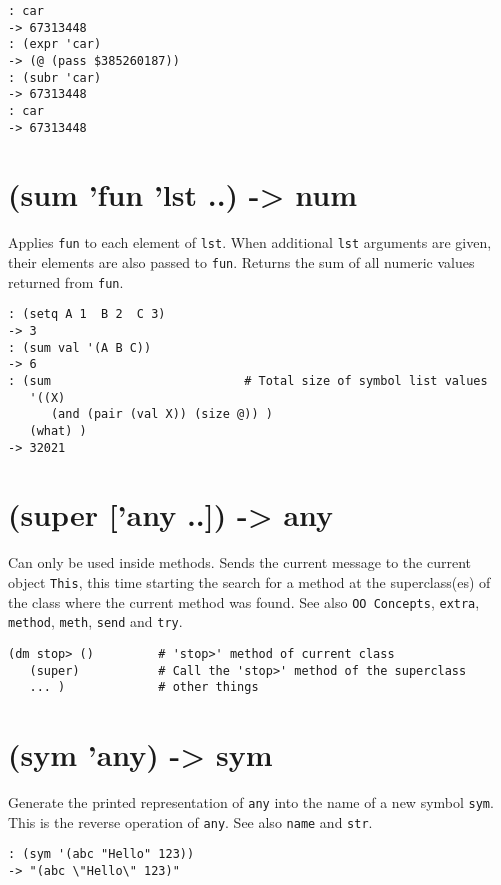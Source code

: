 {{{{{{{{\begin{verbatim}
: car
-> 67313448
: (expr 'car)
-> (@ (pass $385260187))
: (subr 'car)
-> 67313448
: car
-> 67313448
\end{verbatim}

 
\section{(sum 'fun 'lst ..) -> num}
\label{sec-8-1-19-44}


Applies \texttt{fun} to each element of \texttt{lst}. When additional \texttt{lst} arguments
are given, their elements are also passed to \texttt{fun}. Returns the sum of
all numeric values returned from \texttt{fun}.


\begin{verbatim}
: (setq A 1  B 2  C 3)
-> 3
: (sum val '(A B C))
-> 6
: (sum                           # Total size of symbol list values
   '((X)
      (and (pair (val X)) (size @)) )
   (what) )
-> 32021
\end{verbatim}

 
\section{(super ['any ..]) -> any}
\label{sec-8-1-19-45}


Can only be used inside methods. Sends the current message to the
current object \texttt{This}, this time starting the search for a method at the
superclass(es) of the class where the current method was found. See also
\texttt{OO Concepts}, \texttt{extra}, \texttt{method}, \texttt{meth}, \texttt{send} and \texttt{try}.


\begin{verbatim}
(dm stop> ()         # 'stop>' method of current class
   (super)           # Call the 'stop>' method of the superclass
   ... )             # other things
\end{verbatim}

 
\section{(sym 'any) -> sym}
\label{sec-8-1-19-46}


Generate the printed representation of \texttt{any} into the name of a new
symbol \texttt{sym}. This is the reverse operation of \texttt{any}. See also \texttt{name}
and \texttt{str}.


\begin{verbatim}
: (sym '(abc "Hello" 123))
-> "(abc \"Hello\" 123)"
\end{verbatim}

}}}}}}}}
